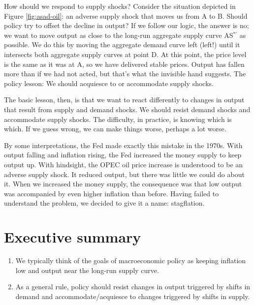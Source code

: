 How should we respond to supply shocks? 
Consider the situation depicted in Figure \ref{fig:asad-oil}:
an adverse supply shock that moves us from A to B.
Should policy try to offset the decline in output?
If we follow our logic, the answer is no;
we want to move output as close to the long-run aggregate supply 
curve AS$^{*\prime}$ as possible.
We do this by moving the aggregate demand
 curve left (left!) until it intersects
both aggregate supply
 curves at point D.
At this point, the price level is the same as it was at A,
so we have delivered stable prices.
Output has fallen more than if we had not acted,
but that's what the invisible hand suggests.
The policy lesson:  We should acquiesce to or accommodate
supply shocks.

The basic lesson, then, is that we want to react differently to
changes in output that result from supply and demand shocks.
We should resist demand shocks and accommodate supply shocks.
The difficulty, in practice, is knowing which is which.
If we guess wrong, we can make things worse, perhaps a lot worse.

By some interpretations, the Fed made exactly this mistake in the 1970s.
With output falling and inflation rising, the Fed increased the money
supply to keep output up.
With hindsight, the OPEC oil price increase is understood to be an
adverse supply shock.
It reduced output, but there was little we could do about it.
When we increased the money supply, the consequence was that low
output was accompanied by even higher inflation than before.
Having failed to understand the problem,
we decided to give it a name:  stagflation.


\section*{Executive summary}

\begin{enumerate}
\item We typically think of the goals of macroeconomic
policy as keeping inflation low and output near the long-run
supply curve.

\item As a general rule, policy should resist changes in output
triggered by shifts in demand and accommodate/acquiesce
to changes triggered by shifts in supply.
\end{enumerate}

